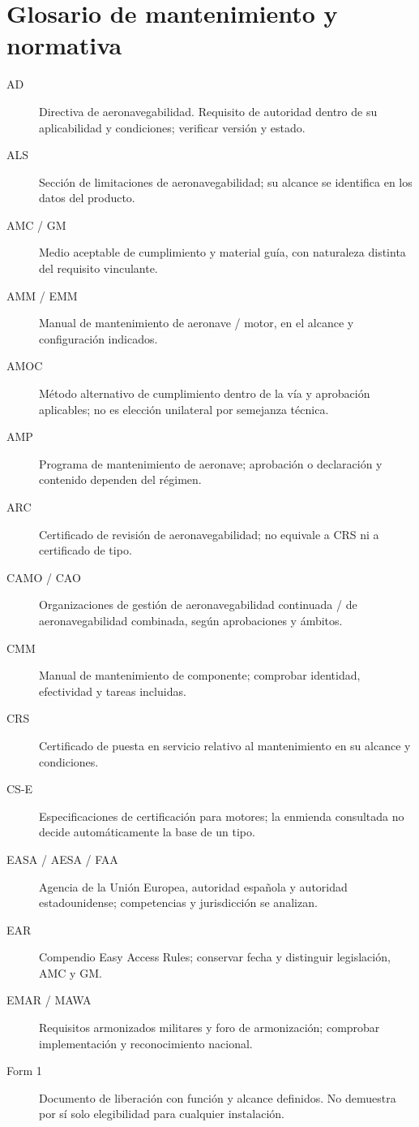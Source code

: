 \chapter{Glosario de mantenimiento y normativa}\label{app:glosario}
\begin{description}
\item[AD] Directiva de aeronavegabilidad. Requisito de autoridad dentro de su aplicabilidad y condiciones; verificar versión y estado.
\item[ALS] Sección de limitaciones de aeronavegabilidad; su alcance se identifica en los datos del producto.
\item[AMC / GM] Medio aceptable de cumplimiento y material guía, con naturaleza distinta del requisito vinculante.
\item[AMM / EMM] Manual de mantenimiento de aeronave / motor, en el alcance y configuración indicados.
\item[AMOC] Método alternativo de cumplimiento dentro de la vía y aprobación aplicables; no es elección unilateral por semejanza técnica.
\item[AMP] Programa de mantenimiento de aeronave; aprobación o declaración y contenido dependen del régimen.
\item[ARC] Certificado de revisión de aeronavegabilidad; no equivale a CRS ni a certificado de tipo.
\item[CAMO / CAO] Organizaciones de gestión de aeronavegabilidad continuada / de aeronavegabilidad combinada, según aprobaciones y ámbitos.
\item[CMM] Manual de mantenimiento de componente; comprobar identidad, efectividad y tareas incluidas.
\item[CRS] Certificado de puesta en servicio relativo al mantenimiento en su alcance y condiciones.
\item[CS-E] Especificaciones de certificación para motores; la enmienda consultada no decide automáticamente la base de un tipo.
\item[EASA / AESA / FAA] Agencia de la Unión Europea, autoridad española y autoridad estadounidense; competencias y jurisdicción se analizan.
\item[EAR] Compendio Easy Access Rules; conservar fecha y distinguir legislación, AMC y GM.
\item[EMAR / MAWA] Requisitos armonizados militares y foro de armonización; comprobar implementación y reconocimiento nacional.
\item[Form 1] Documento de liberación con función y alcance definidos. No demuestra por sí solo elegibilidad para cualquier instalación.

\end{description}
